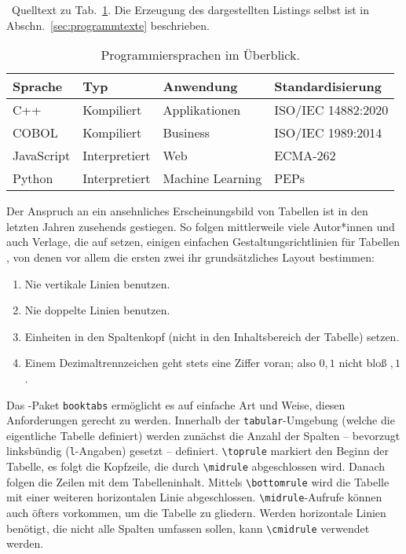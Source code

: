\begin{program}
	\caption{\latex\ Quelltext zu Tab.~\ref{tab:programming-languages}.
	Die Erzeugung des dargestellten Listings selbst ist in Abschn.\
	\ref{sec:programmtexte} beschrieben.}
	\label{prog:programming-languages-source}
%
\begin{LaTeXCode}[numbers=none]
\begin{table}
	\caption{Programmiersprachen im Überblick.}
	\label{tab:programming-languages}
	\centering
	\setlength{\tabcolsep}{10pt} %
	\renewcommand{\arraystretch}{1.25} %
	\begin{tabular}{@{}llll@{}}
		\toprule
		Sprache    & Typ           & Anwendung        & Standardisierung   \\
		\midrule
		C++        & Kompiliert    & Applikationen    & ISO/IEC 14882:2020 \\
		COBOL      & Kompiliert    & Business         & ISO/IEC 1989:2014  \\
		JavaScript & Interpretiert & Web              & ECMA-262           \\
		Python     & Interpretiert & Machine Learning & PEPs               \\
		\bottomrule
	\end{tabular}
\end{table}
\end{LaTeXCode}
%
\end{program}

Der Anspruch an ein ansehnliches Erscheinungsbild von Tabellen ist in den
letzten Jahren zusehends gestiegen. So folgen mittlerweile viele Autor*innen
und auch Verlage, die auf \latex setzen, einigen einfachen
Gestaltungsrichtlinien für Tabellen \cite{Fear2020}, von denen vor allem die
ersten zwei ihr grundsätzliches Layout bestimmen:
%
\begin{enumerate}
	\item Nie vertikale Linien benutzen.
	\item Nie doppelte Linien benutzen.
	\item Einheiten in den Spaltenkopf (nicht in den Inhaltsbereich der
	Tabelle) setzen.
	\item Einem Dezimaltrennzeichen geht stets eine Ziffer voran; also $0{,}1$
	nicht bloß ${,}1$.
\end{enumerate}
%
Das \latex-Paket \texttt{booktabs} ermöglicht es auf einfache Art und Weise,
diesen Anforderungen gerecht zu werden. Innerhalb der
\texttt{tabular}-Umgebung (welche die eigentliche Tabelle definiert) werden
zunächst die Anzahl der Spalten -- bevorzugt linksbündig (\texttt{l}-Angaben)
gesetzt -- definiert. \verb|\toprule| markiert den Beginn der Tabelle, es
folgt die Kopfzeile, die durch \verb|\midrule| abgeschlossen wird. Danach
folgen die Zeilen mit dem Tabelleninhalt. Mittels \verb|\bottomrule| wird die
Tabelle mit einer weiteren horizontalen Linie abgeschlossen.
\verb|\midrule|-Aufrufe können auch öfters vorkommen, um die Tabelle zu
gliedern. Werden horizontale Linien benötigt, die nicht alle Spalten umfassen
sollen, kann \verb|\cmidrule| verwendet werden.

